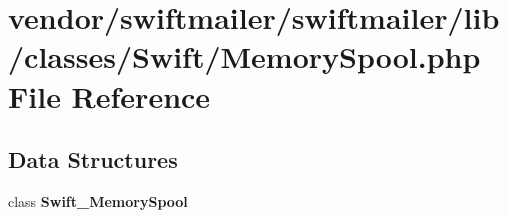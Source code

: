 \section{vendor/swiftmailer/swiftmailer/lib/classes/\+Swift/\+Memory\+Spool.php File Reference}
\label{_memory_spool_8php}
\subsection*{Data Structures}
\begin{DoxyCompactItemize}
\item 
class {\bf Swift\+\_\+\+Memory\+Spool}
\end{DoxyCompactItemize}
